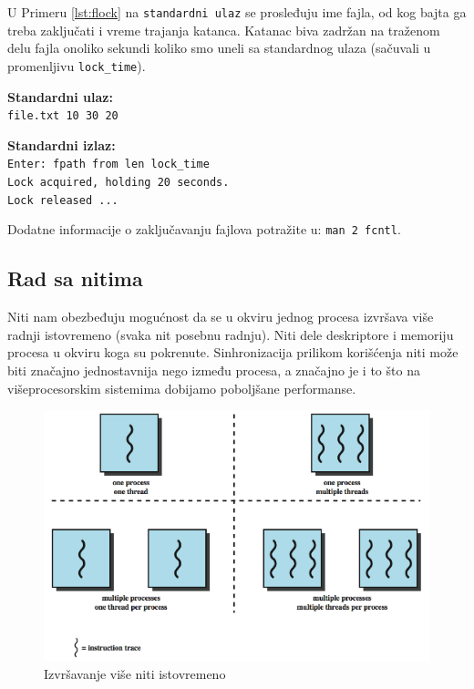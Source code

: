 \documentclass[a4paper, 11pt]{article}
\newcommand{\scode}[3] {
	\hspace{.06\textwidth} 
	\begin{minipage}[t]{.88\textwidth} %
		\begin{mdframed}[topline=true,bottomline=true,leftline=true,rightline=true,backgroundcolor=gray!22, linecolor=gray!60!black,roundcorner=1mm]
			 

	\begin{center}
		\caption{\textbf{Primer \ref{lst:#3}:} #2}
	\end{center}
	\end{mdframed}
	\end{minipage}

}
\newcommand{\stdio}[4] {
	\hspace{.06\textwidth} 
	\begin{minipage}[t]{.88\textwidth} %
		\begin{mdframed}[backgroundcolor=black!7,topline=true,bottomline=true,leftline=true,rightline=true,roundcorner=1mm]
		\begin{minipage}[t]{.5\textwidth} %
			\textbf{#1} \\
				\texttt{#3}
		\end{minipage}
		\begin{minipage}[t]{.5\textwidth} %
			\textbf{#2} \\
				\texttt{#4}
		\end{minipage}
		\end{mdframed}
	\end{minipage}
	\vspace{3mm} 
}
\begin{document}
U Primeru \ref{lst:flock} na \texttt{standardni ulaz} se prosleđuju ime fajla, od kog bajta ga treba zaključati i vreme trajanja katanca. Katanac biva zadržan na traženom delu fajla onoliko sekundi koliko smo uneli sa standardnog ulaza (sačuvali u promenljivu \texttt{lock\_time}).

\vspace{2mm} 
\scode{flock.c}{Zaključavanje fajla}{flock}
\stdio{Standardni ulaz:}{Standardni izlaz:}{\texttt{file.txt 10 30 20}}{\texttt{Enter: fpath from len lock\_time\\Lock acquired, holding 20 seconds.\\ Lock released ...}}

\vspace{3mm} 
Dodatne informacije o zaključavanju fajlova potražite u: \texttt{man 2 fcntl}.

\newpage

\subsection{Rad sa nitima}

Niti nam obezbeđuju mogućnost da se u okviru jednog procesa izvršava više radnji istovremeno (svaka nit posebnu radnju). Niti dele deskriptore i memoriju procesa u okviru koga su pokrenute. Sinhronizacija prilikom korišćenja niti može biti značajno jednostavnija nego između procesa, a značajno je i to što na višeprocesorskim sistemima dobijamo poboljšane performanse.
\vspace{3mm} 

\begin{figure}[h]
	\centering
	\includegraphics[width=.7\textwidth]{./img/mthread.png} %
	\vspace{-2mm} 
	\caption{Izvršavanje više niti istovremeno}
	\label{fig:mthread}
\end{figure}

\scode{mutex_func.c}{Funkcije za rad sa threadovima}{fthreads}	
\end{document}
